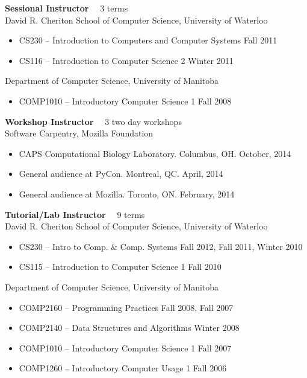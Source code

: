 \documentclass[line,margin]{res}
\begin{document}
\begin{resume}
{\bf Sessional Instructor} ~~3 terms \vspace{4pt} \\
David R. Cheriton School of Computer Science, University of Waterloo
\begin{itemize}  \itemsep -2pt
  \item CS230 -- Introduction to Computers and Computer Systems \hfill Fall 2011
  \item CS116 -- Introduction to Computer Science 2 \hfill Winter 2011
\end{itemize} \vspace{-4pt}
Department of Computer Science, University of Manitoba
\begin{itemize}  \itemsep -2pt
  \item COMP1010 -- Introductory Computer Science 1 \hfill Fall 2008
\end{itemize}

{\bf Workshop Instructor} ~~3 two day workshops \vspace{4pt} \\
Software Carpentry, Mozilla Foundation

\begin{itemize} \itemsep -2pt
  \item CAPS Computational Biology Laboratory. Columbus, OH. \hfill
    October, 2014
  \item General audience at PyCon. Montreal, QC. \hfill April, 2014
  \item General audience at Mozilla. Toronto, ON. \hfill February, 2014
\end{itemize}

{\bf Tutorial/Lab Instructor} ~~9 terms \vspace{4pt} \\
David R. Cheriton School of Computer Science, University of Waterloo
\begin{itemize}  \itemsep -2pt
  \item CS230 -- Intro to Comp. \& Comp. Systems \hfill Fall 2012, Fall 2011, Winter 2010
  \item CS115 -- Introduction to Computer Science 1 \hfill Fall 2010
\end{itemize} \vspace{-4pt}
Department of Computer Science, University of Manitoba
\begin{itemize}  \itemsep -2pt
  \item COMP2160 -- Programming Practices \hfill Fall 2008, Fall 2007
  \item COMP2140 -- Data Structures and Algorithms \hfill Winter 2008
  \item COMP1010 -- Introductory Computer Science 1 \hfill Fall 2007
  \item COMP1260 -- Introductory Computer Usage 1 \hfill Fall 2006
\end{itemize}


\end{resume}
\end{document}
